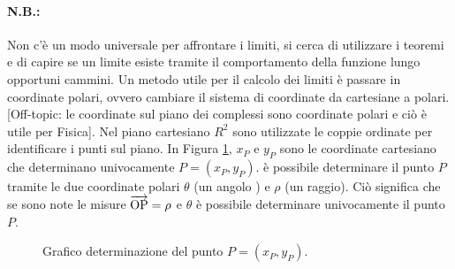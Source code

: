 \paragraph{N.B.:} Non c'è un modo universale per affrontare i limiti, si cerca di utilizzare i teoremi e di capire se un limite esiste tramite il comportamento della funzione lungo opportuni cammini. Un metodo utile per il calcolo dei limiti è passare in coordinate polari, ovvero cambiare il sistema di coordinate da cartesiane a polari. [Off-topic: le coordinate sul piano dei complessi sono coordinate polari e ciò è utile per Fisica]. Nel piano cartesiano $R^2$ sono utilizzate le coppie ordinate per identificare i punti sul piano. In Figura \ref{fig:piano_coordinate_polari}, $x_P$ e $y_P$ sono le coordinate cartesiano che determinano univocamente $P=(x_P, y_P)$. è possibile determinare il punto $P$ tramite le due coordinate polari $\theta$ (un angolo \footnotemark) e $\rho$ (un raggio). Ciò significa che se sono note le misure $\overrightarrow{\rm OP}=\rho$ e $\theta$ è possibile determinare univocamente il punto $P$. 

\begin{figure}
    \centering
    \caption{Grafico determinazione del punto $P=(x_P,y_P)$.}\label{fig:piano_coordinate_polari}
\end{figure}

